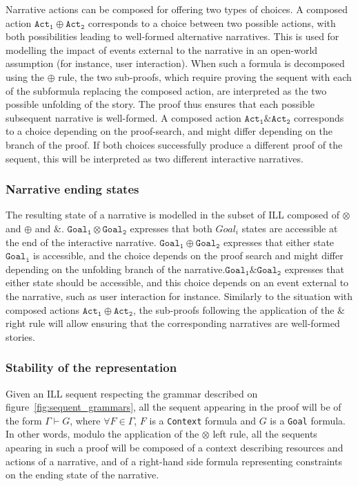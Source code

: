 \documentclass[runningheads,a4paper]{llncs}
\begin{document}
Narrative actions can be composed for offering two types of choices. A composed action $\mathtt{Act_{1}} \oplus \mathtt{Act_{2}}$ corresponds to a choice between two possible actions, with both possibilities leading to well-formed alternative narratives. This is used for modelling the impact of events external to the narrative in an open-world assumption (for instance, user interaction). When such a formula is decomposed using the $\oplus$ rule, the two sub-proofs, which require proving the sequent with each of the subformula replacing the composed action, are interpreted as the two possible unfolding of the story. The proof thus ensures that each possible subsequent narrative is well-formed. A composed action $\mathtt{Act_{1}} \& \mathtt{Act_{2}}$ corresponds to a choice depending on the proof-search, and might differ depending on the branch of the proof. If both choices successfully produce a different proof of the sequent, this will be interpreted as two different interactive narratives.
\subsubsection{Narrative ending states}
The resulting state of a narrative is modelled in the subset of ILL composed of $\otimes$ and $\oplus$ and $\&$. 
$\mathtt{Goal_{1}} \otimes \mathtt{Goal_{2}}$ expresses that both $Goal_{i}$ states are accessible at the end of the interactive narrative. $\mathtt{Goal_{1}} \oplus \mathtt{Goal_{2}}$ expresses that either state $\mathtt{Goal_{i}}$ is accessible, and the choice depends on the proof search and might differ depending on the unfolding branch of the narrative.$\mathtt{Goal_{1}} \& \mathtt{Goal_{2}}$ expresses that either state should be accessible, and this choice depends on an event external to the narrative, such as user interaction for instance. Similarly to the situation with composed actions $\mathtt{Act_1}\oplus\mathtt{Act_2}$, the sub-proofs following the application of the $\&$ right rule will allow ensuring that the corresponding narratives are well-formed stories.
%
\subsubsection{Stability of the representation}
%
Given an ILL sequent respecting the grammar described on figure~\ref{fig:sequent_grammars}, all the sequent appearing in the proof will be of the form $\Gamma\vdash G $, where $\forall F\in\Gamma$, $F$ is a \texttt{Context} formula and $G$ is a \texttt{Goal} formula. In other words, modulo the application of the $\otimes$ left rule, all the sequents apearing in such a proof will be composed of a context describing resources and actions of a narrative, and of a right-hand side formula representing constraints on the ending state of the narrative.
\end{document}
